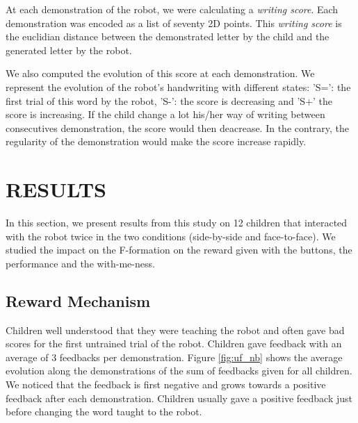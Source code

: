\documentclass[letterpaper, 10 pt, conference]{ieeeconf}  %
\begin{document}
At each demonstration of the robot, we were calculating a \emph{writing score}. 
Each demonstration was encoded as a list of seventy 2D points.
This \emph{writing score} is the euclidian distance between the demonstrated letter by the child and the generated letter by the robot.

We also computed the evolution of this score at each demonstration.
We represent the evolution of the robot's handwriting with different states:
'S=': the first trial of this word by the robot, 'S-': the score is decreasing and 'S+' the score is increasing. 
If the child change a lot his/her way of writing between consecutives demonstration, the score would then deacrease.
In the contrary, the regularity of the demonstration would make the score increase rapidly.


\section{RESULTS}
In this section, we present results from this study on 12 children that interacted with the robot twice in the two conditions (side-by-side and face-to-face).
We studied the impact on the F-formation on the reward given with the buttons, the performance and the with-me-ness.

\subsection{Reward Mechanism}
Children well understood that they were teaching the robot and often gave bad scores for the first untrained trial of the robot.
Children gave feedback with an average of 3 feedbacks per demonstration.
Figure \ref{fig:uf_nb} shows the average evolution along the demonstrations of the sum of feedbacks given for all children.
We noticed that the feedback is first negative and grows towards a positive feedback after each demonstration.
Children usually gave a positive feedback just before changing the word taught to the robot.
\end{document}
